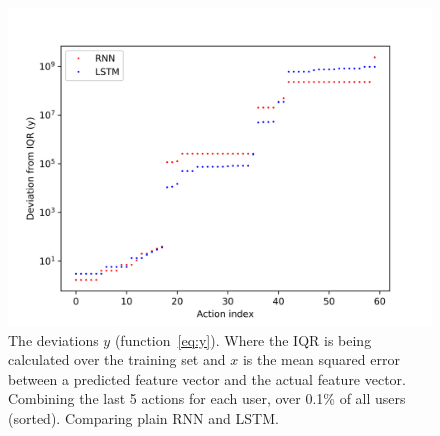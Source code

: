 \begin{figure}
	\begin{center}
		\includegraphics[scale=3.2]{experiments/cell/deviations/rnn_vs_lstm}
	\end{center}
	\caption{The deviations \(y\) (function~\ref{eq:y}). Where the IQR is being calculated over the training set and \(x\) is the mean squared error between a predicted feature vector and the actual feature vector. Combining the last 5 actions for each user, over 0.1\% of all users (sorted). Comparing plain RNN and LSTM.~\label{fig:rnn_vs_lstm}}
\end{figure}

